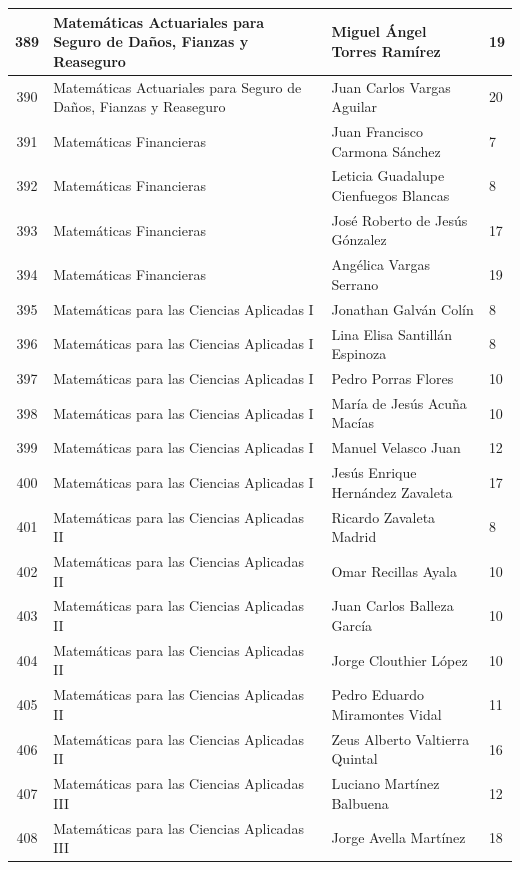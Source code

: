 {\begin{longtable}{|c|p{6.5cm}|p{5cm}|p{1.5cm}|}
  389 & Matemáticas Actuariales para Seguro de Daños, Fianzas y Reaseguro & Miguel Ángel Torres Ramírez & 19 \\ \hline 
  390 & Matemáticas Actuariales para Seguro de Daños, Fianzas y Reaseguro & Juan Carlos Vargas Aguilar & 20 \\ \hline 
  391 & Matemáticas Financieras & Juan Francisco Carmona Sánchez & 7 \\ \hline 
  392 & Matemáticas Financieras & Leticia Guadalupe Cienfuegos Blancas & 8 \\ \hline 
  393 & Matemáticas Financieras & José Roberto de Jesús Gónzalez & 17 \\ \hline 
  394 & Matemáticas Financieras & Angélica Vargas Serrano & 19 \\ \hline 
  395 & Matemáticas para las Ciencias Aplicadas I & Jonathan Galván Colín & 8 \\ \hline 
  396 & Matemáticas para las Ciencias Aplicadas I & Lina Elisa Santillán Espinoza & 8 \\ \hline 
  397 & Matemáticas para las Ciencias Aplicadas I & Pedro Porras Flores & 10 \\ \hline 
  398 & Matemáticas para las Ciencias Aplicadas I & María de Jesús Acuña Macías & 10 \\ \hline 
  399 & Matemáticas para las Ciencias Aplicadas I & Manuel Velasco Juan & 12 \\ \hline 
  400 & Matemáticas para las Ciencias Aplicadas I & Jesús Enrique Hernández Zavaleta & 17 \\ \hline 
  401 & Matemáticas para las Ciencias Aplicadas II & Ricardo Zavaleta Madrid & 8 \\ \hline 
  402 & Matemáticas para las Ciencias Aplicadas II & Omar Recillas Ayala & 10 \\ \hline 
  403 & Matemáticas para las Ciencias Aplicadas II & Juan Carlos Balleza García & 10 \\ \hline 
  404 & Matemáticas para las Ciencias Aplicadas II & Jorge Clouthier López & 10 \\ \hline 
  405 & Matemáticas para las Ciencias Aplicadas II & Pedro Eduardo Miramontes Vidal & 11 \\ \hline 
  406 & Matemáticas para las Ciencias Aplicadas II & Zeus Alberto Valtierra Quintal & 16 \\ \hline 
  407 & Matemáticas para las Ciencias Aplicadas III & Luciano Martínez Balbuena & 12 \\ \hline 
  408 & Matemáticas para las Ciencias Aplicadas III & Jorge Avella Martínez & 18 \\ \hline 

\end{longtable}}
